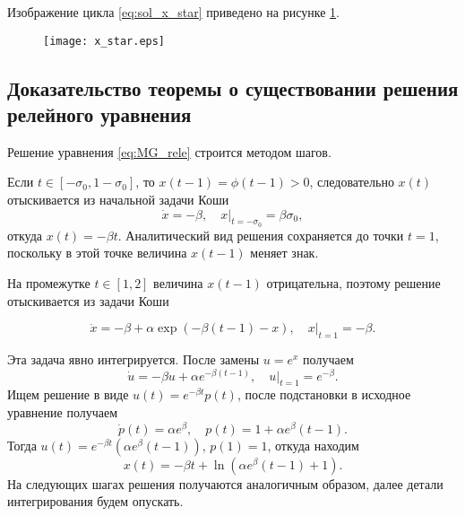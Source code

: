 Изображение цикла \eqref{eq:sol_x_star} приведено на рисунке \ref{fig:x_star:ch1}.

\begin{figure}
\centering
  \texttt{[image: x\_star.eps]}
  \label{fig:x_star:ch1}
\end{figure}


\subsection{Доказательство теоремы о существовании решения релейного уравнения}

Решение уравнения \eqref{eq:MG_rele} строится методом шагов.

Если $t \in [-\sigma_0, 1 - \sigma_0]$, то $x(t - 1) = \phi(t - 1) > 0$, следовательно $x(t)$ отыскивается из начальной задачи Коши
\begin{equation}
    \dot{x} = -\beta, \quad x|_{t = -\sigma_0} = \beta \sigma_0,
\end{equation}
откуда $x(t) = -\beta t$. Аналитический вид решения сохраняется до точки $t = 1$, поскольку в этой точке величина $x(t - 1)$ меняет знак.

На промежутке $t \in [1, 2]$ величина $x(t - 1)$ отрицательна, поэтому решение отыскивается из задачи Коши

\begin{equation}
    \dot{x} = -\beta + \alpha\exp(-\beta(t - 1) - x), \quad x|_{t = 1} = -\beta.
\end{equation}

Эта задача явно интегрируется. После замены $u = e^x$ получаем
\begin{equation*}
	\dot{u} = -\beta u + \alpha e^{-\beta (t - 1)}, \quad u|_{t = 1} = e^{-\beta}.
\end{equation*}
Ищем решение в виде $u(t) = e^{-\beta t} p(t)$, после подстановки в исходное уравнение получаем
\[
\dot{p}(t) = \alpha e^{\beta}, \quad p(t) = 1 + \alpha e^{\beta} (t - 1).
\]
Тогда $u(t) = e^{-\beta t} (\alpha e^{\beta} (t - 1))$, $p(1) = 1$, откуда находим
\begin{equation}
\label{eq:solution_step1:ch1}
    x(t) = -\beta t +\ln(\alpha e^{\beta}(t - 1) + 1).
\end{equation}
%
На следующих шагах решения получаются аналогичным образом, далее детали интегрирования будем опускать.

